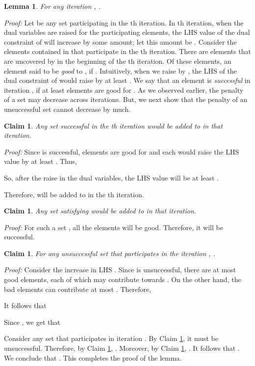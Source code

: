 \documentclass[11pt]{article}
\newtheorem{lemma}[theorem]{\bf Lemma}
\newtheorem{claim}[theorem]{\bf Claim}
\newcommand {\myproof} {{\it Proof: }}
\newcommand {\qed} {\hfill}
\begin{document}
\begin{lemma}
\label{lem:RRR}
For any iteration , .
\end{lemma}
\myproof
Let  be any set participating in the th iteration.
In th iteration, when the dual variables are raised for the participating elements,
the LHS value of the dual constraint of  will increase by some amount; let this amount be .
Consider the  elements contained in  that participate in the th iteration.
There are  elements that are uncovered by  in the beginning of the th iteration.
Of these elements, an element  said to be {\em good} to , if .
Intuitively, when we raise  by , the LHS of the dual constraint of  would raise by
at least . We say that an element  is {\em successful} in iteration ,
if at least  elements are good for .
As we observed earlier, the penalty of a set may decrease across iterations.
But, we next show that the penalty of an unsuccessful set cannot decrease by much.

\begin{claim}
\label{claim:EEE}
Any set  successful in the th iteration would be added to  in that iteration.
\end{claim}
\myproof
Since  is successful,  elements are good for  and each would raise the LHS
value by at least . Thus, 

So, after the raise in the dual variables, the LHS value will be at least .

Therefore,  will be added to  in the th iteration.
\qed

\begin{claim}
\label{claim:FFF}
Any set  satisfying  would be added to  in that iteration.
\end{claim}
\myproof 
For such a set , all the  elements will be good. Therefore, it will be successful.
\qed

\begin{claim}
\label{claim:GGG}
For any unsuccessful set  that participates in the iteration ,
.
\end{claim}
\myproof
Consider the increase in LHS .
Since  is unsuccessful, there are at most  good elements,
each of which may contribute  towards .
On the other hand, the bad elements can contribute at most .
Therefore,

It follows that

Since , we get that

\qed

Consider any set  that participates in iteration .
By Claim \ref{claim:EEE}, it must be unsuccessful. Therefore, by Claim \ref{claim:GGG},
. Moreover, by Claim \ref{claim:FFF}, . 
It follows that .
We conclude that .
This completes the proof of the lemma.
\qed
\end{document}

